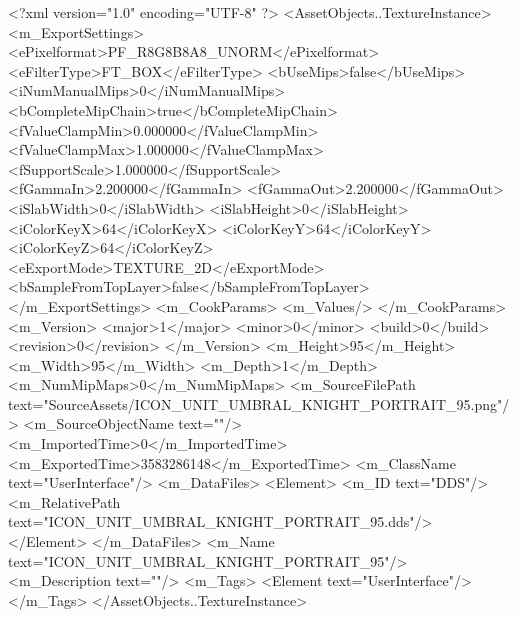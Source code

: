 <?xml version="1.0" encoding="UTF-8" ?>
<AssetObjects..TextureInstance>
	<m_ExportSettings>
		<ePixelformat>PF_R8G8B8A8_UNORM</ePixelformat>
		<eFilterType>FT_BOX</eFilterType>
		<bUseMips>false</bUseMips>
		<iNumManualMips>0</iNumManualMips>
		<bCompleteMipChain>true</bCompleteMipChain>
		<fValueClampMin>0.000000</fValueClampMin>
		<fValueClampMax>1.000000</fValueClampMax>
		<fSupportScale>1.000000</fSupportScale>
		<fGammaIn>2.200000</fGammaIn>
		<fGammaOut>2.200000</fGammaOut>
		<iSlabWidth>0</iSlabWidth>
		<iSlabHeight>0</iSlabHeight>
		<iColorKeyX>64</iColorKeyX>
		<iColorKeyY>64</iColorKeyY>
		<iColorKeyZ>64</iColorKeyZ>
		<eExportMode>TEXTURE_2D</eExportMode>
		<bSampleFromTopLayer>false</bSampleFromTopLayer>
	</m_ExportSettings>
	<m_CookParams>
		<m_Values/>
	</m_CookParams>
	<m_Version>
		<major>1</major>
		<minor>0</minor>
		<build>0</build>
		<revision>0</revision>
	</m_Version>
	<m_Height>95</m_Height>
	<m_Width>95</m_Width>
	<m_Depth>1</m_Depth>
	<m_NumMipMaps>0</m_NumMipMaps>
	<m_SourceFilePath text="SourceAssets/ICON_UNIT_UMBRAL_KNIGHT_PORTRAIT_95.png"/>
	<m_SourceObjectName text=""/>
	<m_ImportedTime>0</m_ImportedTime>
	<m_ExportedTime>3583286148</m_ExportedTime>
	<m_ClassName text="UserInterface"/>
	<m_DataFiles>
		<Element>
			<m_ID text="DDS"/>
			<m_RelativePath text="ICON_UNIT_UMBRAL_KNIGHT_PORTRAIT_95.dds"/>
		</Element>
	</m_DataFiles>
	<m_Name text="ICON_UNIT_UMBRAL_KNIGHT_PORTRAIT_95"/>
	<m_Description text=""/>
	<m_Tags>
		<Element text="UserInterface"/>
	</m_Tags>
</AssetObjects..TextureInstance>

